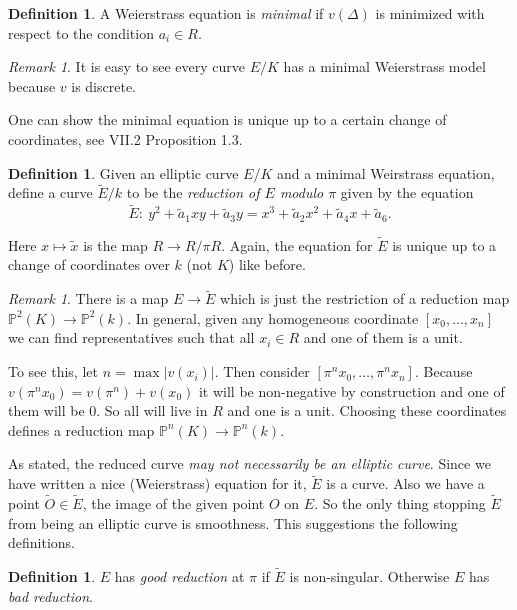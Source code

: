 \documentclass[11pt]{article}
\newcommand{\BB}[1]{\mathbb{#1}} %
\newcommand{\PP}{\BB{P}}
\theoremstyle{plain}%
\theoremstyle{definition}
\newtheorem{defn}[thm]{Definition}
\theoremstyle{remark}
\newtheorem{rem}[thm]{Remark}
\begin{document}
\begin{defn} %
	A Weierstrass equation is \emph{minimal} if $v(\Delta)$ is minimized with respect to the condition $a_i\in R$.
\end{defn}
\begin{rem}
	It is easy to see every curve $E/K$ has a minimal Weierstrass model because $v$ is discrete.
\end{rem}

One can show the minimal equation is unique up to a certain change of coordinates, see VII.2 Proposition 1.3.

\begin{defn} %
	Given an elliptic curve $E/K$ and a minimal Weirstrass equation, define a curve $\tilde{E}/k$ to be the \emph{reduction of $E$ modulo $\pi$} given by the equation
	$$
	\tilde{E} : \
	y^2 + \tilde{a}_1xy + \tilde{a}_3y
	=
	x^3 + \tilde{a}_2x^2 + \tilde{a}_4x + \tilde{a}_6.
	$$
\end{defn}
Here $x\mapsto\tilde{x}$ is the map $R\to R/\pi R$. Again, the equation for $\tilde{E}$ is unique up to a change of coordinates over $k$ (not $K$) like before.

\begin{rem}
	There is a map $E\to\tilde{E}$ which is just the restriction of a reduction map $\PP^2(K)\to\PP^2(k)$. In general, given any homogeneous coordinate $[x_0,\dots,x_n]$ we can find representatives such that all $x_i\in R$ and one of them is a unit.

	To see this, let $n = \max|v(x_i)|$. Then consider $[\pi^nx_0,\dots,\pi^nx_n]$. Because $v(\pi^nx_0)=v(\pi^n)+v(x_0)$ it will be non-negative by construction and one of them will be $0$. So all will live in $R$ and one is a unit. Choosing these coordinates defines a reduction map $\PP^n(K)\to\PP^n(k)$.
\end{rem}


As stated, the reduced curve \emph{may not necessarily be an elliptic curve}. Since we have written a nice (Weierstrass) equation for it, $\tilde{E}$ is a curve. Also we have a point $\tilde{O}\in\tilde{E}$, the image of the given point $O$ on $E$. So the only thing stopping $\tilde{E}$ from being an elliptic curve is smoothness. This suggestions the following definitions.

\begin{defn} %
	$E$ has \emph{good reduction} at $\pi$ if $\tilde{E}$ is non-singular. Otherwise $E$ has \emph{bad reduction}.
\end{defn}
\end{document}
